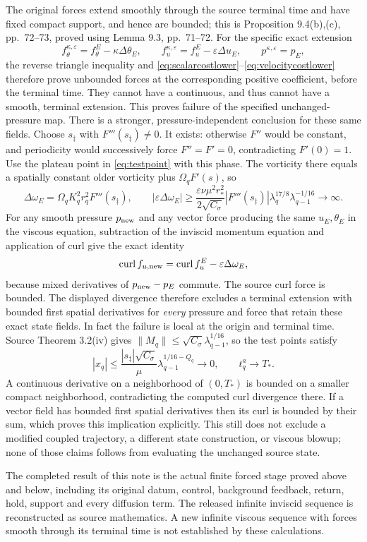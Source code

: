 The original forces extend smoothly through the source terminal
time and have fixed compact support, and hence are bounded;
this is Proposition 9.4(b),(c), pp.~72--73, proved using
Lemma 9.3, pp.~71--72.
For the specific exact extension
\[
 f_\theta^{\kappa,\varepsilon}=f_\theta^E-\kappa\Delta\theta_E,
 \qquad f_u^{\kappa,\varepsilon}=f_u^E-\varepsilon\Delta u_E,
 \qquad p^{\kappa,\varepsilon}=p_E,
\]
the reverse triangle inequality and
\eqref{eq:scalarcostlower}--\eqref{eq:velocitycostlower}
therefore prove unbounded forces at the corresponding positive
coefficient, before the terminal time. They cannot have a
continuous, and thus cannot have a smooth, terminal extension.
This proves failure of the specified unchanged-pressure map.
There is a stronger, pressure-independent conclusion for these
same fields. Choose $s_\ddagger$ with $F'''(s_\ddagger)\ne0$.
It exists: otherwise $F''$ would be constant, and periodicity
would successively force $F''=F'=0$, contradicting $F'(0)=1$.
Use the plateau point in \eqref{eq:testpoint} with this phase.
The vorticity there equals a spatially constant older vorticity
plus $\Omega_qF'(s)$, so
\[
 \Delta\omega_E=\Omega_qK_q^2r_q^2F'''(s_\ddagger),\qquad
 |\varepsilon\Delta\omega_E|
 \geq\frac{\varepsilon\nu\mu^2r_*^2}{2\sqrt{C_\sigma}}
 |F'''(s_\ddagger)|\lambda_q^{17/8}
 \lambda_{q-1}^{-1/16}\longrightarrow\infty.
\]
For any smooth pressure $p_{\rm new}$ and any vector force
producing the same $u_E,\theta_E$ in the viscous equation,
subtraction of the inviscid momentum equation and application
of curl give the exact identity
\[
 \operatorname{curl}f_{u,\rm new}
 =\operatorname{curl}f_u^E-\varepsilon\Delta\omega_E,
\]
because mixed derivatives of $p_{\rm new}-p_E$ commute.
The source curl force is bounded. The displayed divergence
therefore excludes a terminal extension with bounded first
spatial derivatives for \emph{every} pressure and force that
retain these exact state fields. In fact the failure is local
at the origin and terminal time. Source Theorem 3.2(iv) gives
$\|M_q\|\leq\sqrt{C_\sigma}\lambda_{q-1}^{1/16}$, so the
test points satisfy
\[
 |x_q|\leq\frac{|s_\ddagger|\sqrt{C_\sigma}}\mu
 \lambda_{q-1}^{1/16-Q_q}\longrightarrow0,
 \qquad t_q^a\longrightarrow T_*.
\]
A continuous derivative on a neighborhood of $(0,T_*)$ is
bounded on a smaller compact neighborhood, contradicting the
computed curl divergence there. If a vector field has bounded
first spatial derivatives then its curl is bounded by their
sum, which proves this implication explicitly. This still
does not exclude a modified coupled trajectory, a different
state construction, or viscous blowup; none of those claims
follows from evaluating the unchanged source state.

The completed result of this note is the actual finite forced
stage proved above and below, including its original datum,
control, background feedback, return, hold, support and every
diffusion term. The released infinite inviscid sequence is
reconstructed as source mathematics. A new infinite viscous
sequence with forces smooth through its terminal time is not
established by these calculations.


